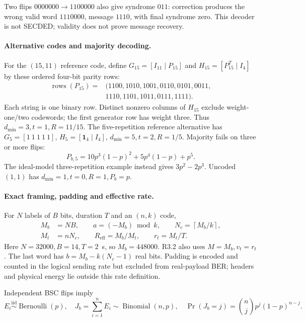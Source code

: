 Two flips $0000000\to1100000$ also give syndrome $011$: correction produces
the wrong valid word $1110000$, message $1110$, with final syndrome zero.
This decoder is not SECDED; validity does not prove message recovery.

\paragraph{Alternative codes and majority decoding.}
For the $(15,11)$ reference code, define $G_{15}=[I_{11}\mid P_{15}]$ and
$H_{15}=[P_{15}^T\mid I_4]$ by these ordered four-bit parity rows:
\begin{equation}
 \begin{aligned}
 \operatorname{rows}(P_{15})={}&(1100,1010,1001,0110,0101,0011,\\
 &1110,1101,1011,0111,1111).
 \end{aligned}
 \label{eq:r32-p15}
\end{equation}
Each string is one binary row. Distinct nonzero columns of $H_{15}$ exclude
weight-one/two codewords; the first generator row has weight three.
Thus $d_{\min}=3,t=1,R=11/15$. The five-repetition reference alternative has
$G_5=[1\ 1\ 1\ 1\ 1]$, $H_5=[\mathbf1_4\mid I_4]$,
$d_{\min}=5,t=2,R=1/5$. Majority fails on three or more flips:
\begin{equation}
 P_{b,5}=10p^3(1-p)^2+5p^4(1-p)+p^5.
 \label{eq:r32-repeat}
\end{equation}
The ideal-model three-repetition example instead gives $3p^2-2p^3$. Uncoded $(1,1)$ has
$d_{\min}=1,t=0,R=1,P_b=p$.

\paragraph{Exact framing, padding and effective rate.}
For $N$ labels of $B$ bits, duration $T$ and an $(n,k)$ code,
\begin{align}
 M_b&=NB,\qquad a=(-M_b)\bmod k,\qquad
 N_c=\left\lceil M_b/k\right\rceil,\nonumber\\
 M_t&=nN_c,\qquad R_{\mathrm{eff}}=M_b/M_t,\qquad r_t=M_t/T.
 \label{eq:r32-framing}
\end{align}
Here $N=32000,B=14,T=2$~s, so $M_b=448000$. R3.2 also uses $M=M_b,v_t=r_t$.
The last word has $b=M_b-k(N_c-1)$ real bits. Padding is encoded and counted
in the logical sending rate but excluded from real-payload BER; headers
and physical energy lie outside this rate definition.

Independent BSC flips imply
\begin{equation}
 E_i\overset{\mathrm{iid}}{\sim}\operatorname{Bernoulli}(p),\quad
 J_b=\sum_{i=1}^n E_i\sim\operatorname{Binomial}(n,p),\quad
 \Pr(J_b=j)=\binom njp^j(1-p)^{n-j}.
 \label{eq:r32-binomial}
\end{equation}

